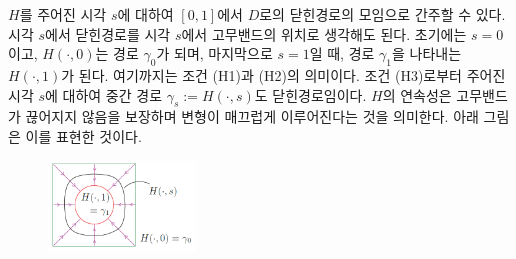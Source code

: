 $H$를 주어진 시각 $s$에 대하여
$[0,1]$에서 $D$로의 닫힌경로의 모임으로 간주할 수 있다.
시각 $s$에서 닫힌경로를 시각 $s$에서 고무밴드의 위치로 생각해도 된다.
초기에는 $s=0$이고, $H(\cdot, 0)$는 경로 $\gamma_0$가 되며,
마지막으로 $s=1$일 때, 경로 $\gamma_1$을 나타내는
$H(\cdot, 1)$가 된다.
여기까지는 조건 (H1)과 (H2)의 의미이다.
조건 (H3)로부터 주어진 시각 $s$에 대하여 중간 경로 
$\gamma_s:= H(\cdot, s)$도 닫힌경로임이다.
$H$의 연속성은 고무밴드가 끊어지지 않음을 보장하며
변형이 매끄럽게 이루어진다는 것을 의미한다.
아래 그림은 이를 표현한 것이다.

\begin{figure}[!h]
\begin{center}
\includegraphics[width=0.35\textwidth]{./SaltChapter/fig-3-0-2}
\end{center}
\end{figure}

\newpage  %

